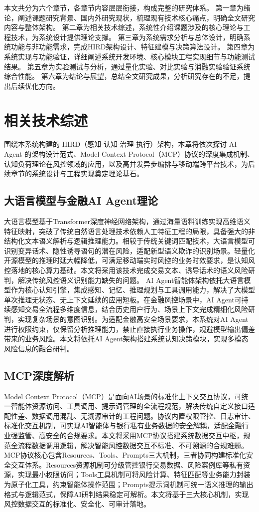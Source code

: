 \documentclass{xduugthesis}
\begin{document}
本文共分为六个章节，各章节内容层层衔接，构成完整的研究体系。
第一章为绪论，阐述课题研究背景、国内外研究现状，梳理现有技术核心痛点，明确全文研究内容与整体架构。
第二章为相关技术综述，系统性介绍课题涉及的核心理论与工程技术，为系统设计提供理论支撑。
第三章为系统需求分析与总体设计，明确系统功能与非功能需求，完成HIRD架构设计、特征建模与决策算法设计。
第四章为系统实现与功能验证，详细阐述系统开发环境、核心模块工程实现细节与功能测试结果。
第五章为实验测试与分析，通过量化实验、对比实验与消融实验验证系统综合性能。
第六章为结论与展望，总结全文研究成果，分析研究存在的不足，提出后续优化方向。


\chapter{相关技术综述}
围绕本系统构建的 HIRD（感知-认知-治理-执行）架构，本章将依次探讨 AI Agent 的架构设计范式、Model Context Protocol（MCP）协议的深度集成机制、认知负荷理论在风控领域的应用，以及高并发异步编排与移动端跨平台技术，为后续章节的系统设计与工程实现奠定理论基石。
\section{大语言模型与金融AI Agent理论}
大语言模型基于Transformer深度神经网络架构，通过海量语料训练实现高维语义特征映射，突破了传统自然语言处理技术依赖人工特征工程的局限，具备强大的非结构化文本语义解析与逻辑推理能力\cite{nicolaou2025llm}。相较于传统关键词匹配技术，大语言模型可识别变异话术、隐性诱导语句的潜在风险，适配新型语义欺诈的识别场景。轻量化开源模型的推理时延大幅降低，可满足移动端实时风控的业务时效要求，是认知风控落地的核心算力基础。本文将采用该技术完成交易文本、诱导话术的语义风险研判，解决传统风控语义识别能力缺失的问题。
AI Agent智能体架构依托大语言模型作为核心认知引擎，集成感知、记忆、推理规划与工具调用能力，解决了大模型单次推理无状态、无上下文延续的应用短板\cite{ zangana2025llm}。在金融风控场景中，AI Agent可持续感知交易全流程多维度信息，结合历史用户行为、场景上下文完成精细化风险研判，实现复杂场景的意图识别。为适配金融高安全场景要求，本系统对AI Agent进行权限约束，仅保留分析推理能力，禁止直接执行业务操作，规避模型输出偏差带来的业务风险。本文将依托AI Agent架构搭建系统认知决策模块，实现多模态风险信息的融合研判。

\section{MCP深度解析}
Model Context Protocol（MCP）是面向AI场景的标准化上下文交互协议，可统一智能体资源访问、工具调用、提示词管理的全流程规范，解决传统自定义接口适配性差、数据调用混乱、无溯源审计的工程问题。协议内置权限管控、日志审计、标准化交互机制，可实现AI智能体与银行私有业务数据的安全解耦，适配金融行业强监管、高安全的合规要求。本文将采用MCP协议搭建系统数据交互中枢，规范全流程数据调用逻辑，解决智能风控数据交互不标准、不可溯源的合规难题。
MCP协议核心包含Resources、Tools、Prompts三大机制，三者协同构建标准化安全交互体系。Resources资源机制可分级管控银行交易数据、风险案例库等私有资源，实现最小权限访问；Tools工具机制可将风险计算、特征匹配等业务能力封装为原子化工具，约束智能体操作范围；Prompts提示词机制可统一语义推理的输出格式与逻辑范式，保障AI研判结果稳定可解析。本文将基于三大核心机制，实现风控数据交互的标准化、安全化、可审计落地。
\end{document}
